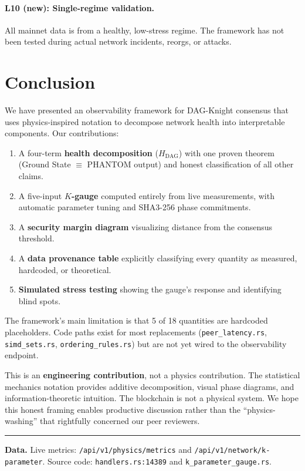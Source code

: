 \documentclass[11pt,a4paper]{article}
\begin{document}
\paragraph{L10 (new): Single-regime validation.} All mainnet data is from a healthy, low-stress regime. The framework has not been tested during actual network incidents, reorgs, or attacks.

\section{Conclusion}

We have presented an observability framework for DAG-Knight consensus that uses physics-inspired notation to decompose network health into interpretable components. Our contributions:

\begin{enumerate}[nosep]
    \item A four-term \textbf{health decomposition} ($H_{\text{DAG}}$) with one proven theorem (Ground State $\equiv$ PHANTOM output) and honest classification of all other claims.
    \item A five-input \textbf{$K$-gauge} computed entirely from live measurements, with automatic parameter tuning and SHA3-256 phase commitments.
    \item A \textbf{security margin diagram} visualizing distance from the consensus threshold.
    \item A \textbf{data provenance table} explicitly classifying every quantity as measured, hardcoded, or theoretical.
    \item \textbf{Simulated stress testing} showing the gauge's response and identifying blind spots.
\end{enumerate}

The framework's main limitation is that 5 of 18 quantities are hardcoded placeholders. Code paths exist for most replacements (\texttt{peer\_latency.rs}, \texttt{simd\_sets.rs}, \texttt{ordering\_rules.rs}) but are not yet wired to the observability endpoint.

This is an \textbf{engineering contribution}, not a physics contribution. The statistical mechanics notation provides additive decomposition, visual phase diagrams, and information-theoretic intuition. The blockchain is not a physical system. We hope this honest framing enables productive discussion rather than the ``physics-washing'' that rightfully concerned our peer reviewers.

\vspace{0.5cm}
\hrule
\vspace{0.3cm}
{\small\textbf{Data.} Live metrics: \texttt{/api/v1/physics/metrics} and \texttt{/api/v1/network/k-parameter}. Source code: \texttt{handlers.rs:14389} and \texttt{k\_parameter\_gauge.rs}.}
\end{document}
